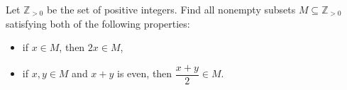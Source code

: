 Let \(\mathbb{Z}_{>0}\) be the set of positive integers. Find all nonempty subsets \(M \subseteq \mathbb{Z}_{>0}\) satisfying both of the following properties:
\begin{itemize}
    \item[(a)] if \(x \in M\), then \(2x \in M\),
    \item[(b)] if \(x, y \in M\) and \(x + y\) is even, then \(\dfrac{x+y}{2} \in M\).
\end{itemize}
